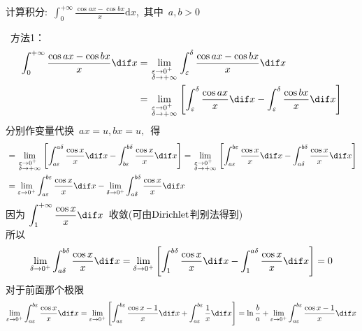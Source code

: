 \documentclass[color=green,titlestyle=hang]{elegantbook}%
\begin{document}
\begin{exercise}
计算积分:~$\displaystyle\int_0^{+\infty}  \frac{{\cos ax - \cos bx}}{x}\textrm{d}x$,~其中~$a,b>0$
\end{exercise}\begin{solution}~方法1：
\begin{align*}
\int_0^{+\infty}  {\frac{{\cos ax - \cos bx}}{x}\dif x}  &= \mathop {\lim }\limits_{\scriptstyle\varepsilon  \to {0^ + }\hfill\atop
\scriptstyle\delta  \to  + \infty \hfill} \int_\varepsilon ^\delta  {\frac{{\cos ax - \cos bx}}{x}\dif x} \\
&= \mathop {\lim }\limits_{\scriptstyle\varepsilon  \to {0^ + }\hfill\atop	\scriptstyle\delta  \to  + \infty \hfill} \left[ {\int_\varepsilon ^\delta  {\frac{{\cos ax}}{x}\dif x}  - \int_\varepsilon ^\delta  {\frac{{\cos bx}}{x}\dif x} } \right]
\end{align*}
分别作变量代换~$ax = u,bx = u,$~得
\begin{align*}	
&= \mathop {\lim }\limits_{\scriptstyle\varepsilon  \to {0^ + }\hfill\atop
\scriptstyle\delta  \to  + \infty \hfill} \left[ {\int_{a\varepsilon }^{a\delta } {\frac{{\cos x}}{x}\dif x}  - \int_{b\varepsilon }^{b\delta } {\frac{{\cos x}}{x}\dif x} } \right] = \mathop {\lim }\limits_{\scriptstyle\varepsilon  \to {0^ + }\hfill\atop
\scriptstyle\delta  \to  + \infty \hfill} \left[ {\int_{a\varepsilon }^{b\varepsilon } {\frac{{\cos x}}{x}\dif x}  - \int_{a\delta }^{b\delta } {\frac{{\cos x}}{x}\dif x} } \right]\\		
&= \mathop {\lim }\limits_{\varepsilon  \to {0^ + }} \int_{a\varepsilon }^{b\varepsilon } {\frac{{\cos x}}{x}\dif x}  - \mathop {\lim }\limits_{\delta  \to {0^ + }} \int_{a\delta }^{b\delta } {\frac{{\cos x}}{x}\dif x}
\end{align*}
因为 $\displaystyle\int_1^{+\infty}  {\frac{{\cos x}}{x}\dif x}$~收敛(可由${\rm{Dirichlet}}$判别法得到)\\
所以\begin{equation*}
\mathop {\lim }\limits_{\delta  \to {0^ + }} \int_{a\delta }^{b\delta } {\frac{{\cos x}}{x}\dif x}  = \mathop {\lim }\limits_{\delta  \to {0^ + }} \left[ {\int_1^{b\delta } {\frac{{\cos x}}{x}\dif x}  - \int_1^{a\delta } {\frac{{\cos x}}{x}\dif x} } \right] = 0
\end{equation*}
对于前面那个极限~\begin{equation*}
\lim\limits_{\varepsilon  \to {0^ + }} \int_{a\varepsilon }^{b\varepsilon } {\frac{{\cos x}}{x}\dif x}  =\lim\limits_{\varepsilon  \to {0^ + }} \left[ {\int_{a\varepsilon }^{b\varepsilon } {\frac{{\cos x - 1}}{x}\dif x}  + \int_{a\varepsilon }^{b\varepsilon } {\frac{1}{x}\dif x} } \right]= \ln \frac{b}{a} + \lim\limits_{\varepsilon  \to {0^ + }} \int_{a\varepsilon }^{b\varepsilon } {\frac{{\cos x - 1}}{x}\dif x} 

\end{equation*}
\end{solution}
\end{document}
